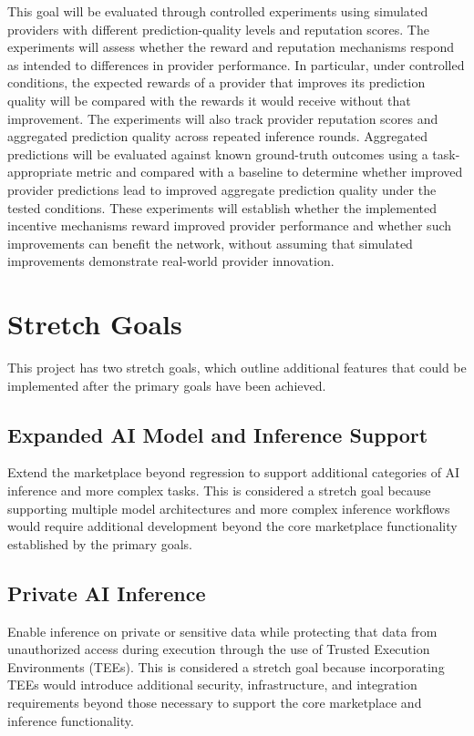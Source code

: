 \documentclass{article}
\begin{document}
This goal will be evaluated through controlled experiments using
simulated providers with different prediction-quality levels and
reputation scores. The experiments will assess whether the reward
and reputation mechanisms respond as intended to differences in
provider performance. In particular, under controlled conditions,
the expected rewards of a provider that improves its prediction
quality will be compared with the rewards it would receive without
that improvement. The experiments will also track provider
reputation scores and aggregated prediction quality across repeated
inference rounds. Aggregated predictions will be evaluated against
known ground-truth outcomes using a task-appropriate metric and
compared with a baseline to determine whether improved provider
predictions lead to improved aggregate prediction quality under
the tested conditions. These experiments will establish whether
the implemented incentive mechanisms reward improved provider
performance and whether such improvements can benefit the network,
without assuming that simulated improvements demonstrate real-world
provider innovation.

\section{Stretch Goals}

This project has two stretch goals, which outline additional
features that could be implemented after the primary goals have been
achieved.

\subsection{Expanded AI Model and Inference Support}

Extend the marketplace beyond regression to support additional categories of AI inference and more complex tasks. This is considered a stretch
goal because supporting multiple model architectures and more complex
inference workflows would require additional development beyond the core
marketplace functionality established by the primary goals.

\subsection{Private AI Inference}

Enable inference on private or sensitive data while protecting that data
from unauthorized access during execution through the use of Trusted
Execution Environments (TEEs). This is considered a stretch goal because
incorporating TEEs would introduce additional security, infrastructure,
and integration requirements beyond those necessary to support the core
marketplace and inference functionality.
\end{document}
